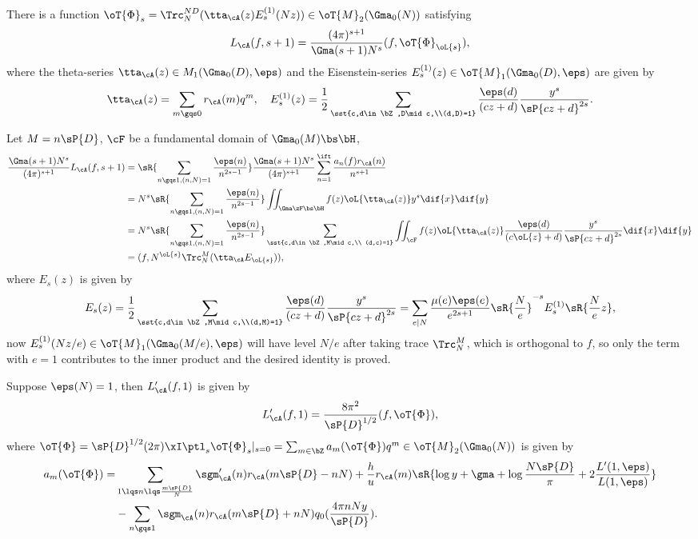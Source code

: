 \documentclass[article, a4paper, twoside]{universal}
\begin{document}
\begin{thm}[{\cite[IV.1.2]{GZ1986}}]\label{thm:Rankin}
	There is a function $\oT{\Phi}_{s}=\Trc_{N}^{ND}(\tta_{\cA}(z)E_{s}^{(1)}(Nz))\in\oT{M}_{2}(\Gma_{0}(N))$ satisfying
	\[
		L_{\cA}(f,s+1)=\frac{(4\pi)^{s+1}}{\Gma(s+1)N^{s}}(f,\oT{\Phi}_{\oL{s}}),
	\]
	where the theta-series $\tta_{\cA}(z)\in M_{1}(\Gma_{0}(D),\eps)$ and the Eisenstein-series $E_{s}^{(1)}(z)\in \oT{M}_{1}(\Gma_{0}(D),\eps)$ are given by
	\[
		\tta_{\cA}(z)=\sum_{m\gqs0}r_{\cA}(m)q^{m},\quad E_{s}^{(1)}(z)=\frac{1}{2}\sum_{\sst{c,d\in\bZ,D\mid c,\\(d,D)=1}}\frac{\eps(d)}{(cz+d)}\frac{y^{s}}{\sP{cz+d}^{2s}}.
	\]
\end{thm}

\begin{prf}
	Let $M=n\sP{D}$, $\cF$ be a fundamental domain of $\Gma_{0}(M)\bs\bH$,
	\begin{align*}
	  \frac{\Gma(s+1)N^{s}}{(4\pi)^{s+1}}L_{\cA}(f,s+1)&=\sR{\sum_{n\gqs1,(n,N)=1}\frac{\eps(n)}{n^{2s-1}}}\frac{\Gma(s+1)N^{s}}{(4\pi)^{s+1}}\sum_{n=1}^{\ift}\frac{a_{n}(f)r_{\cA}(n)}{n^{s+1}}\\
	  &=N^{s}\sR{\sum_{n\gqs1,(n,N)=1}\frac{\eps(n)}{n^{2s-1}}}\iint_{\Gma\zF\bs\bH}f(z)\oL{\tta_{\cA}(z)}y^{s}\dif{x}\dif{y}\\
	&=N^{s}\sR{\sum_{n\gqs1,(n,N)=1}\frac{\eps(n)}{n^{2s-1}}}\sum_{\sst{c,d\in\bZ,M\mid c,\\ (d,c)=1}}\iint_{\cF}f(z)\oL{\tta_{\cA}(z)}\frac{\eps(d)}{(c\oL{z}+d)}\frac{y^{s}}{\sP{cz+d}^{2s}}\dif{x}\dif{y}\\
	  &=(f,N^{\oL{s}}\Trc_{N}^{M}(\tta_{\cA}E_{\oL{s}})),
	\end{align*}
	where $E_{s}(z)$ is given by
	\[
	  E_{s}(z)=\frac{1}{2}\sum_{\sst{c,d\in\bZ,M\mid c,\\(d,M)=1}}\frac{\eps(d)}{(cz+d)}\frac{y^{s}}{\sP{cz+d}^{2s}}=\sum_{e\mid N}\frac{\mu(e)\eps(e)}{e^{2s+1}}\sR{\frac{N}{e}}^{-s}E_{s}^{(1)}\sR{\frac{N}{e}z},
  	\]
	now $E_{s}^{(1)}(Nz/e)\in\oT{M}_{1}(\Gma_{0}(M/e),\eps)$ will have level $N/e$ after taking trace $\Trc_{N}^{M}$, which is orthogonal to $f$, so only the term with $e=1$ contributes to the inner product and the desired identity is proved.
\end{prf}

\begin{thm}[{\cite[IV.4.5]{GZ1986}}]\label{thm:coef}
	Suppose $\eps(N)=1$, then $L_{\cA}'(f,1)$ is given by
	\[
		L_{\cA}'(f,1)=\frac{8\pi^{2}}{\sP{D}^{1/2}}(f,\oT{\Phi}),
	\]
	where $\oT{\Phi}=\sP{D}^{1/2}(2\pi)\xI \ptl_{s}\oT{\Phi}_{s}|_{s=0}=\sum_{m\in\bZ}a_{m}(\oT{\Phi})q^{m}\in\oT{M}_{2}(\Gma_{0}(N))$ is given by
	\begin{align*}
	  a_{m}(\oT{\Phi})=&\sum_{1\lqs n\lqs \frac{m\sP{D}}{N}}\sgm_{\cA}'(n)r_{\cA}(m\sP{D}-nN)+\frac{h}{u}r_{\cA}(m)\sR{\log y+\gma+\log\frac{N\sP{D}}{\pi}+2\frac{L'(1,\eps)}{L(1,\eps)}}\\
					  &-\sum_{n\gqs1}\sgm_{\cA}(n)r_{\cA}(m\sP{D}+nN)q_{0}(\frac{4\pi nNy}{\sP{D}}).
	\end{align*}
\end{thm}
\end{document}
